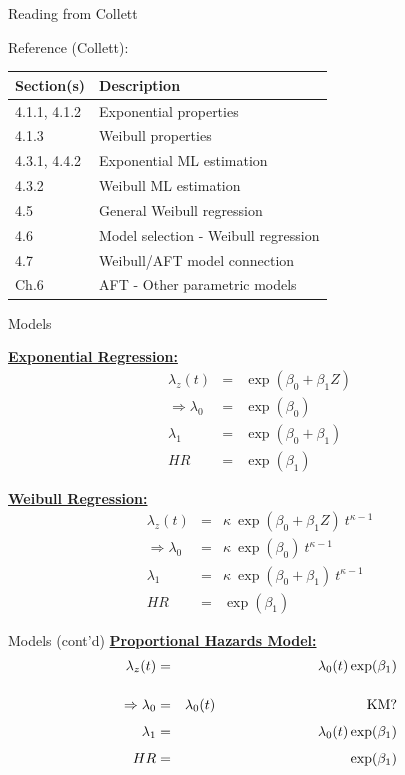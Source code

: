 \documentclass[envcountsect, 10pt, portrait, palatino]{beamer}
\begin{document}
\begin{frame}{ Reading from Collett}

Reference (Collett):
\\[2ex]
\begin{tabular}{ll}
{\bf Section(s)} & {\bf Description} \\ \hline
4.1.1, 4.1.2 & Exponential properties\\
4.1.3 & Weibull properties\\
4.3.1, 4.4.2 & Exponential ML estimation\\
4.3.2 & Weibull ML estimation\\
4.5 & General Weibull regression\\
4.6 & Model selection - Weibull regression\\
4.7 & Weibull/AFT model connection\\
Ch.6 & AFT - Other parametric models\\
\end{tabular}
\end{frame} 
\begin{frame}{ Models}

\underline{\bf Exponential Regression:}
\begin{eqnarray*}
\lambda_z(t) & = & \exp(\beta_0 + \beta_1 Z)\\[3ex]
\Rightarrow \lambda_0 & = & \exp(\beta_0)\\[1ex]
            \lambda_1 & = & \exp(\beta_0+\beta_1)\\[1ex]
                   HR & = & \exp(\beta_1)
\end{eqnarray*}

\underline{\bf Weibull Regression:}
\begin{eqnarray*}
\lambda_z(t) & = & \kappa ~\exp(\beta_0 + \beta_1 Z) ~t^{\kappa-1}\\[3ex]
\Rightarrow \lambda_0 & = & \kappa ~\exp(\beta_0) ~t^{\kappa-1}\\[1ex]
            \lambda_1 & = & \kappa ~\exp(\beta_0+\beta_1) ~t^{\kappa-1}\\[1ex]
                   HR & = & \exp(\beta_1)
\end{eqnarray*}
\end{frame}
\begin{frame}{Models (cont'd)}
\underline{\bf Proportional Hazards Model:}
\begin{eqnarray*}
\lambda_z(t) & = & \lambda_0(t) \exp(\beta_1)\\[3ex]
\Rightarrow \lambda_0 & = & \lambda_0(t) \hspace{1.5in} \mbox{KM?}\\[1ex]
            \lambda_1 & = & \lambda_0(t) \exp(\beta_1)\\[1ex]
                   HR & = & \exp(\beta_1)
\end{eqnarray*}
\end{frame} 
\end{document}
